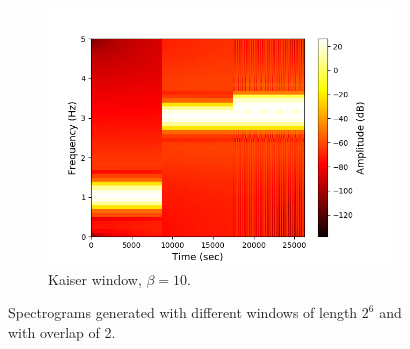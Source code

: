 \begin{figure}[H]
\begin{subfigure}{0.49\textwidth}
\includegraphics[width=\textwidth]{figures/stft_windows/100/kaiser_10.png}
\caption{Kaiser window, $\beta=10$.}
\label{fig:stft_kaiser_100_10}
\end{subfigure}
\caption{Spectrograms generated with different windows of length $2^6$ and with overlap of 2.}
\label{fig:stft_windows_100}
\end{figure}
